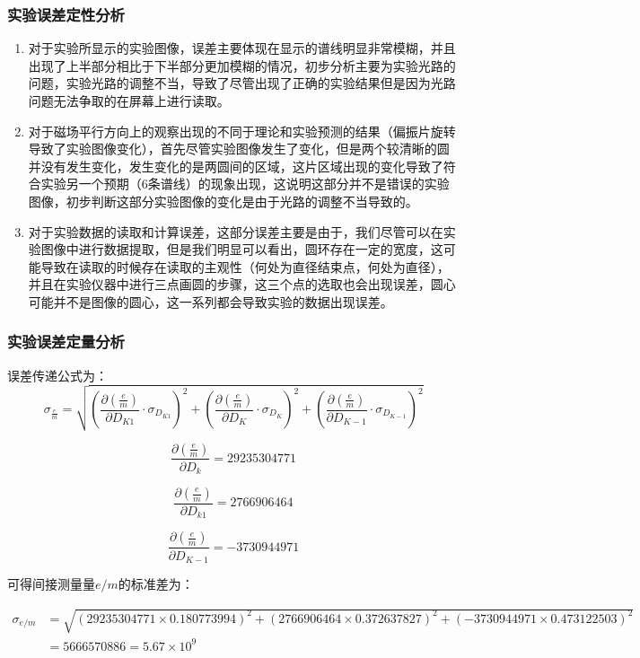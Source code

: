 \documentclass[dvipsnames, svgnames,a4paper,11pt]{article}
\begin{document}
	\subsubsection{实验误差定性分析}
	\begin{enumerate}
		\item 对于实验所显示的实验图像，误差主要体现在显示的谱线明显非常模糊，并且出现了上半部分相比于下半部分更加模糊的情况，初步分析主要为实验光路的问题，实验光路的调整不当，导致了尽管出现了正确的实验结果但是因为光路问题无法争取的在屏幕上进行读取。
		\item 对于磁场平行方向上的观察出现的不同于理论和实验预测的结果（偏振片旋转导致了实验图像变化），首先尽管实验图像发生了变化，但是两个较清晰的圆并没有发生变化，发生变化的是两圆间的区域，这片区域出现的变化导致了符合实验另一个预期（6条谱线）的现象出现，这说明这部分并不是错误的实验图像，初步判断这部分实验图像的变化是由于光路的调整不当导致的。
		\item 对于实验数据的读取和计算误差，这部分误差主要是由于，我们尽管可以在实验图像中进行数据提取，但是我们明显可以看出，圆环存在一定的宽度，这可能导致在读取的时候存在读取的主观性（何处为直径结束点，何处为直径），并且在实验仪器中进行三点画圆的步骤，这三个点的选取也会出现误差，圆心可能并不是图像的圆心，这一系列都会导致实验的数据出现误差。
	\end{enumerate}
	
	\subsubsection{实验误差定量分析}
	误差传递公式为：\[
			\sigma_{\frac{e}{m}} = \sqrt{\left(\frac{\partial\left(\frac{e}{m}\right)}{\partial D_{K1}} \cdot \sigma_{D_{K1}}\right)^2 + \left(\frac{\partial\left(\frac{e}{m}\right)}{\partial D_K} \cdot \sigma_{D_K}\right)^2 + \left(\frac{\partial\left(\frac{e}{m}\right)}{\partial D_{K-1}} \cdot \sigma_{D_{K-1}}\right)^2}
		\]
	
	\[
			\frac{\partial\left(\frac{e}{m}\right)}{\partial D_k} = 29235304771
		\]

		\[
			\frac{\partial\left(\frac{e}{m}\right)}{\partial D_{k1}} =  2766906464
		\]

		\[
			\frac{\partial\left(\frac{e}{m}\right)}{\partial D_{K-1}}  = -3730944971
		\]

		可得间接测量量$e/m$的标准差为：

		\[
			\begin{aligned}
			\sigma_{e/m} &= \sqrt{(29235304771 \times 0.180773994)^2 + (2766906464 \times 0.372637827)^2 + (-3730944971 \times 0.473122503)^2 } \\
			&= 5666570886 = 5.67 \times 10^9
			\end{aligned}
		\]
\end{document}
